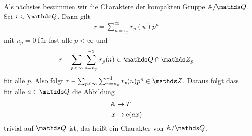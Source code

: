 Als nächstes bestimmen wir die Charaktere der kompakten Gruppe $\A/\Q$.
Sei $r\in \Q$. Dann gilt
\begin{align*}
r=\sum_{n=n_p}^\infty r_p(n)p^n
\end{align*}
mit $n_p=0$ für fast alle $p<\infty$ und
\begin{align*}
r-\sum_{p<\infty} \sum_{n=n_p}^{-1}r_p(n) \in \Q \cap \Z_p
\end{align*}
für alle $p$. Also folgt $r-\sum_{p<\infty} \sum_{n=n_p}^{-1}r_p(n)p^n \in \Z$.
Daraus folgt dass für alle $a\in \Q$ die Abbildung
\begin{align*}
\mathbb{A} &\to T\\
x &\mapsto \mathrm{e}(ax)
\end{align*}
trivial auf $\Q$ ist, das heißt ein Charakter von $\A / \Q$.

